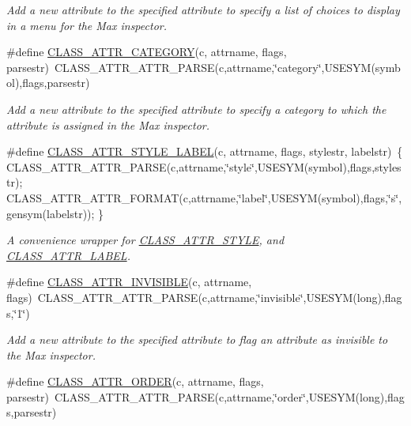 \begin{DoxyCompactItemize}
\begin{DoxyCompactList}\small\item\em Add a new attribute to the specified attribute to specify a list of choices to display in a menu for the Max inspector. \item\end{DoxyCompactList}\item 
\#define \hyperlink{group__attr_ga1bae4d6ba42e2a7cc9e1bc648ccfb421}{CLASS\_\-ATTR\_\-CATEGORY}(c, attrname, flags, parsestr)~CLASS\_\-ATTR\_\-ATTR\_\-PARSE(c,attrname,\char`\"{}category\char`\"{},USESYM(symbol),flags,parsestr)
\begin{DoxyCompactList}\small\item\em Add a new attribute to the specified attribute to specify a category to which the attribute is assigned in the Max inspector. \item\end{DoxyCompactList}\item 
\#define \hyperlink{group__attr_ga1a55732bfe15aff297a7a025ce578d6e}{CLASS\_\-ATTR\_\-STYLE\_\-LABEL}(c, attrname, flags, stylestr, labelstr)~\{ CLASS\_\-ATTR\_\-ATTR\_\-PARSE(c,attrname,\char`\"{}style\char`\"{},USESYM(symbol),flags,stylestr); CLASS\_\-ATTR\_\-ATTR\_\-FORMAT(c,attrname,\char`\"{}label\char`\"{},USESYM(symbol),flags,\char`\"{}s\char`\"{},gensym(labelstr)); \}
\begin{DoxyCompactList}\small\item\em A convenience wrapper for \hyperlink{group__attr_ga16521ec1560a294041e78dacf6f8e4ee}{CLASS\_\-ATTR\_\-STYLE}, and \hyperlink{group__attr_gad46aeee11e8b4786332ce4ff43963326}{CLASS\_\-ATTR\_\-LABEL}. \item\end{DoxyCompactList}\item 
\#define \hyperlink{group__attr_ga764637d4034e5ce81cf523f5b69c102b}{CLASS\_\-ATTR\_\-INVISIBLE}(c, attrname, flags)~CLASS\_\-ATTR\_\-ATTR\_\-PARSE(c,attrname,\char`\"{}invisible\char`\"{},USESYM(long),flags,\char`\"{}1\char`\"{})
\begin{DoxyCompactList}\small\item\em Add a new attribute to the specified attribute to flag an attribute as invisible to the Max inspector. \item\end{DoxyCompactList}\item 
\#define \hyperlink{group__attr_gad7180abb3483e57b94e3c2603b862730}{CLASS\_\-ATTR\_\-ORDER}(c, attrname, flags, parsestr)~CLASS\_\-ATTR\_\-ATTR\_\-PARSE(c,attrname,\char`\"{}order\char`\"{},USESYM(long),flags,parsestr)

\end{DoxyCompactItemize}
